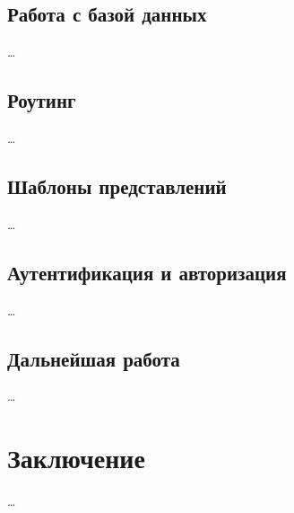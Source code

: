 \documentclass[a4paper,12pt]{article}
\begin{document}
\subsection{Работа с базой данных}
\dots

\subsection{Роутинг}
\dots

\subsection{Шаблоны представлений}
\dots

\subsection{Аутентификация и авторизация}
\dots

\subsection{Дальнейшая работа}
\dots

\section*{Заключение}
\dots

\begin{thebibliography}{99}
	
\end{thebibliography}
\end{document}
